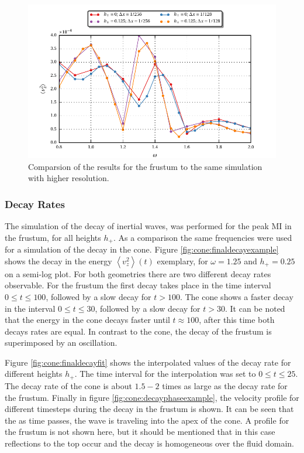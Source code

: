 \begin{figure}[!b]
  \centering
  \includegraphics{gfx/cone/final/hd_comparison.pdf}
  \caption{
      \label{fig:cone:finalhdcomp}
      Comparsion of the results for the frustum to the same simulation with higher resolution.
    }
\end{figure}
\clearpage

\subsubsection{Decay Rates}

The simulation of the decay of inertial waves, was performed for the peak M\RN{1} in the frustum,
for all heights $h_+$.
As a comparison the same frequencies were used for a simulation of the decay in the cone.
Figure \ref{fig:cone:finaldecayexample} shows the decay in the energy  $\left<v_z^2\right>(t)$  exemplary,
for $\omega=1.25$ and $h_+=0.25$ on a semi-log plot.
For both geometries there are two different decay rates observable.
For the frustum the first decay takes place in the time interval $0\leq t\leq 100$,
followed by a slow decay for $t>100$.
The cone shows a faster decay in the interval $0\leq t\leq 30$, followed by a slow decay for $t>30$.
It can be noted that the energy in the cone decays faster until $t\approx100$, after this time
both decays rates are  equal.  In contrast to the cone, the decay of the frustum  is superimposed by an oscillation.

Figure \ref{fig:cone:finaldecayfit} shows the interpolated values of the decay rate for different
heights $h_+$.  The time interval for the interpolation was set to $0 \leq t \leq 25$.
The decay rate of the cone is about $1.5-2$ times as large as the decay rate for the frustum.
Finally in figure \ref{fig:cone:decayphaseexample}, the velocity profile for different timesteps during the decay in
the frustum is shown.
It can be seen that the as time passes, the wave is traveling into the apex of the cone.
A profile for the frustum is not shown here, but it should be mentioned that in this case reflections to the top occur
and the decay is homogeneous over the fluid domain.

